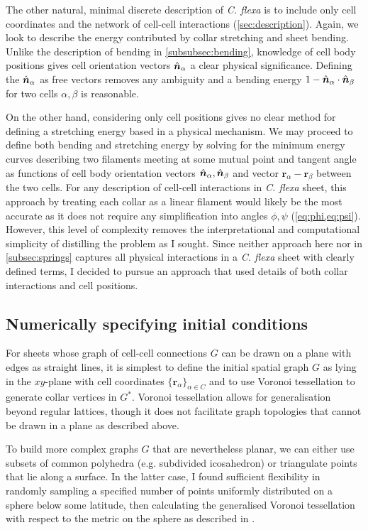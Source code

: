 The other natural, minimal discrete description of \textit{C. flexa} is to include only cell coordinates and the network of cell-cell interactions (\cref{sec:description}).
Again, we look to describe the energy contributed by collar stretching and sheet bending.
Unlike the description of bending in \cref{subsubsec:bending}, knowledge of cell body positions gives cell orientation vectors $\hat{\bm{n}}_\alpha$ a clear physical significance.
Defining the $\hat{\bm{n}}_\alpha$ as free vectors removes any ambiguity and a bending energy $1 - \hat{\bm{n}}_\alpha \cdot \hat{\bm{n}}_\beta$ for two cells $\alpha, \beta$ is reasonable.

On the other hand, considering only cell positions gives no clear method for defining a stretching energy based in a physical mechanism.
We may proceed to define both bending and stretching energy by solving for the minimum energy curves describing two filaments meeting at some mutual point and tangent angle as functions of cell body orientation vectors $\hat{\bm{n}}_\alpha, \hat{\bm{n}}_\beta$ and vector $\bm{r}_\alpha - \bm{r}_\beta$ between the two cells.
For any description of cell-cell interactions in \textit{C. flexa} sheet, this approach by treating each collar as a linear filament would likely be the most accurate as it does not require any simplification into angles $\phi, \psi$ (\cref{eq:phi,eq:psi}).
However, this level of complexity removes the interpretational and computational simplicity of distilling the problem as I sought. 
Since neither approach here nor in \cref{subsec:springs} captures all physical interactions in a \textit{C. flexa} sheet with clearly defined terms, I decided to pursue an approach that used details of both collar interactions and cell positions.

\subsection{Numerically specifying initial conditions} \label{subsec:init}

For sheets whose graph of cell-cell connections $G$ can be drawn on a plane with edges as straight lines, it is simplest to define the initial spatial graph $G$ as lying in the $xy$-plane with cell coordinates $\{\bm{r}_\alpha\}_{\alpha\in C}$ and to use Voronoi tessellation to generate collar vertices in $G^*$. 
Voronoi tessellation allows for generalisation beyond regular lattices, though it does not facilitate graph topologies that cannot be drawn in a plane as described above. 

To build more complex graphs $G$ that are nevertheless planar, we can either use subsets of common polyhedra (e.g. subdivided icosahedron) or triangulate points that lie along a surface. 
In the latter case, I found sufficient flexibility in randomly sampling a specified number of points uniformly distributed on a sphere below some latitude, then calculating the generalised Voronoi tessellation with respect to the metric on the sphere as described in \citet{caroli2010}.

